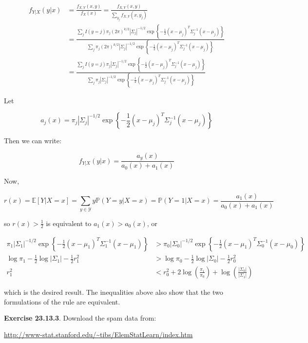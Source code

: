 \begin{align*}
f_{Y | X}(y | x) &= \frac{f_{X, Y}(x, y)}{f_X(x)} = \frac{f_{X, Y}(x, y)}{\sum_{y_{j}} f_{X, Y}(x, y_{j})} \\
&= \frac{\sum_{j} I(y = j) \pi_{j} (2 \pi)^{k / 2} |\Sigma_{j}|^{-1/2} \exp \left\{ -\frac{1}{2} (x - \mu_{j})^T \Sigma_{j}^{-1} (x - \mu_{j}) \right\}}{\sum_{j} \pi_{j} (2 \pi)^{k / 2} |\Sigma_{j}|^{-1/2} \exp \left\{ -\frac{1}{2} (x - \mu_{j})^T \Sigma_{j}^{-1} (x - \mu_{j}) \right\}} \\
&= \frac{\sum_{j} I(y = j) \pi_{j} |\Sigma_{j}|^{-1/2} \exp \left\{ -\frac{1}{2} (x - \mu_{j})^T \Sigma_{j}^{-1} (x - \mu_{j}) \right\}}{\sum_{j} \pi_{j} |\Sigma_{j}|^{-1/2} \exp \left\{ -\frac{1}{2} (x - \mu_{j})^T \Sigma_{j}^{-1} (x - \mu_{j}) \right\}}
\end{align*}

Let

\[ a_{j}(x) = \pi_{j} |\Sigma_{j}|^{-1/2} \exp \left\{ -\frac{1}{2} (x - \mu_{j})^T \Sigma_{j}^{-1} (x - \mu_{j}) \right\} \]

Then we can write:

\[
f_{Y | X}(y | x) = \frac{a_y(x)}{a_{0}(x) + a_{1}(x)}
\]

Now,

\[ r(x) = \mathbb{E}[Y | X = x] = \sum_{y \in \mathcal{Y}} y \mathbb{P}(Y = y | X = x) = \mathbb{P}(Y = 1 | X = x) = \frac{a_{1}(x)}{a_{0}(x) + a_{1}(x)}\]

so \(r(x) > \frac{1}{2}\) is equivalent to \(a_{1}(x) > a_{0}(x)\), or

\begin{align*}
\pi_{1} |\Sigma_{1}|^{-1/2} \exp \left\{ -\frac{1}{2} (x - \mu_{1})^T \Sigma_{1}^{-1} (x - \mu_{1}) \right\}
&>
\pi_{0} |\Sigma_{0}|^{-1/2} \exp \left\{ -\frac{1}{2} (x - \mu_{1})^T \Sigma_{0}^{-1} (x - \mu_{0}) \right\} \\
\log \pi_{1} - \frac{1}{2} \log |\Sigma_{1}| - \frac{1}{2} r_{1}^{2}
&>
\log \pi_{0} - \frac{1}{2} \log |\Sigma_{0}| -\frac{1}{2} r_{0}^{2} \\
r_{1}^{2} &< r_{0}^{2} + 2 \log \left( \frac{\pi_{1}}{\pi_{0}} \right) + \log \left( \frac{| \Sigma_{0} | }{ | \Sigma_{1}| }
\right)
\end{align*}

which is the desired result. The inequalities above also show that the
two formulations of the rule are equivalent.

\textbf{Exercise 23.13.3}. Download the spam data from:

\url{http://www-stat.stanford.edu/~tibs/ElemStatLearn/index.htm}

